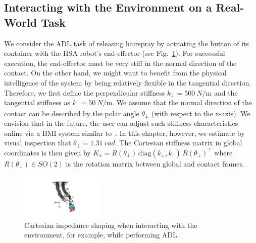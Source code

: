 \subsection{Interacting with the Environment on a Real-World Task}\label{sub:braincontrol:experiments:adl}
We consider the \gls{ADL} task of releasing hairspray by actuating the button of its container with the \gls{HSA} robot's end-effector (see Fig.~\ref{fig:braincontrol:cartesian_impedance_adl}). For successful execution, the end-effector must be very stiff in the normal direction of the contact. On the other hand, we might want to benefit from the physical intelligence of the system by being relatively flexible in the tangential direction. Therefore, we first define the perpendicular stiffness $k_\perp = \SI{500}{N\per\meter}$ and the tangential stiffness as $k_\parallel = \SI{50}{N \per \meter}$. We assume that the normal direction of the contact can be described by the polar angle $\theta_\perp$ (with respect to the x-axis). We envision that in the future, the user can adjust such stiffness characteristics online via a \gls{BMI} system similar to~\citep{schiatti2017soft}. In this chapter, however, we estimate by visual inspection that $\theta_\perp=\SI{1.31}{rad}$.
The Cartesian stiffness matrix in global coordinates is then given by $K_x = R(\theta_\perp) \, \mathrm{diag}(k_\perp, k_\parallel) \, R(\theta_\perp)^\top$
where $R(\theta_\perp) \in SO(2)$ is the rotation matrix between global and contact frames.

\begin{figure}[hbt]
    \centering
    \includegraphics[width=0.35\textwidth]{braincontrol/figures/adl_task/cartesian_impedance_adl_cropped.pdf}
    \caption{Cartesian impedance shaping when interacting with the environment, for example, while performing \gls{ADL}. }
    \label{fig:braincontrol:cartesian_impedance_adl}
\end{figure}

